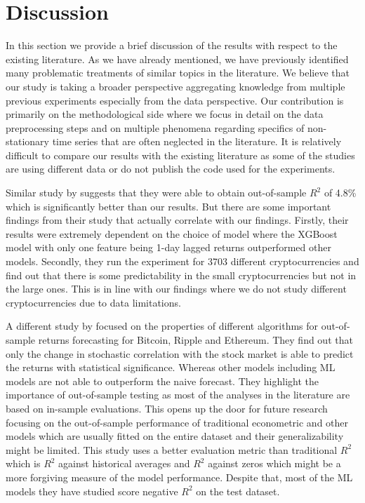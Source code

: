 \section{Discussion}
\label{sec:discussion}

In this section we provide a brief discussion
of the results with respect to the existing literature.
As we have already mentioned, we have previously
identified many problematic treatments of 
similar topics in the literature. We believe
that our study is taking a broader 
perspective aggregating knowledge
from multiple previous experiments especially from the data perspective. 
Our contribution is primarily on the 
methodological side where we focus 
in detail on the data preprocessing steps and 
on multiple phenomena regarding specifics
of non-stationary time series that are often neglected in the literature.
It is relatively difficult to compare our results with
the existing literature as 
some of the studies are using different data
or do not publish the code used for the experiments.



Similar study by 
\cite{Liu2023} suggests
that they were able to obtain out-of-sample $R^2$  of 4.8\%
which is significantly better than our results.
But there are some important findings from their study
that actually correlate with our findings.
Firstly, their results were extremely 
dependent on the choice of model where the XGBoost model
with only one feature being 1-day lagged returns outperformed 
other models. 
Secondly, they run the experiment
for 3703 different cryptocurrencies and find out 
that there is some predictability in the small
cryptocurrencies but not in the large ones. This
is in line with our findings where
we do not study different cryptocurrencies due to data limitations.


A different study by
\cite{Yae2022} focused on the properties
of different algorithms for out-of-sample returns forecasting
for Bitcoin, Ripple and Ethereum. 
They find out that only the change in stochastic correlation with the stock
market is able to predict the returns with statistical significance.
Whereas other models including \ac{ML} models 
are not able to outperform the naive forecast. 
They highlight the importance of out-of-sample testing
as most of the analyses in the literature are based on in-sample evaluations.
This opens up the door for future research focusing
on the out-of-sample performance of traditional econometric and other models
which are usually fitted on the entire dataset and their generalizability 
might be limited. This study 
uses a better evaluation metric than traditional $R^2$ 
which is $R^2$ against historical averages and $R^2$ against zeros
which might be a more forgiving measure of the model performance.
Despite that, 
most of the \ac{ML} models they have studied score negative $R^2$ on 
the test dataset.

